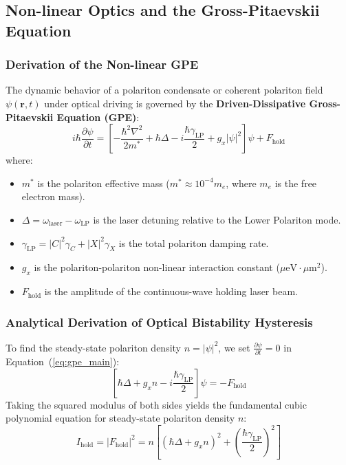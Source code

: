 \documentclass[11pt,a4paper]{article}
\begin{document}
\subsection{Non-linear Optics and the Gross-Pitaevskii Equation}

\subsubsection{Derivation of the Non-linear GPE}
The dynamic behavior of a polariton condensate or coherent polariton field $\psi(\mathbf{r}, t)$ under optical driving is governed by the \textbf{Driven-Dissipative Gross-Pitaevskii Equation (GPE)}:
\begin{equation}
i\hbar \frac{\partial \psi}{\partial t} = \left[ -\frac{\hbar^2 \nabla^2}{2m^*} + \hbar\Delta - i\frac{\hbar\gamma_{\text{LP}}}{2} + g_x |\psi|^2 \right] \psi + F_{\text{hold}}
\label{eq:gpe_main}
\end{equation}
where:
\begin{itemize}
    \item $m^*$ is the polariton effective mass ($m^* \approx 10^{-4} m_e$, where $m_e$ is the free electron mass).
    \item $\Delta = \omega_{\text{laser}} - \omega_{\text{LP}}$ is the laser detuning relative to the Lower Polariton mode.
    \item $\gamma_{\text{LP}} = |C|^2 \gamma_C + |X|^2 \gamma_X$ is the total polariton damping rate.
    \item $g_x$ is the polariton-polariton non-linear interaction constant ($\mu\text{eV}\cdot\mu\text{m}^2$).
    \item $F_{\text{hold}}$ is the amplitude of the continuous-wave holding laser beam.
\end{itemize}

\subsubsection{Analytical Derivation of Optical Bistability Hysteresis}
To find the steady-state polariton density $n = |\psi|^2$, we set $\frac{\partial \psi}{\partial t} = 0$ in Equation~(\ref{eq:gpe_main}):
\begin{equation}
\left[ \hbar\Delta + g_x n - i\frac{\hbar\gamma_{\text{LP}}}{2} \right] \psi = -F_{\text{hold}}
\end{equation}
Taking the squared modulus of both sides yields the fundamental cubic polynomial equation for steady-state polariton density $n$:
\begin{equation}
I_{\text{hold}} = |F_{\text{hold}}|^2 = n \left[ (\hbar\Delta + g_x n)^2 + \left(\frac{\hbar\gamma_{\text{LP}}}{2}\right)^2 \right]
\label{eq:bistability_cubic}
\end{equation}
\end{document}
